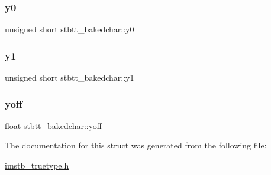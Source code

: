 \subsubsection{\texorpdfstring{y0}{y0}}
{\footnotesize\ttfamily unsigned short stbtt\+\_\+bakedchar\+::y0}

\mbox{\label{structstbtt__bakedchar_ac831dc667f6c39b5d22740c6cbd5bc3f}} 
\subsubsection{\texorpdfstring{y1}{y1}}
{\footnotesize\ttfamily unsigned short stbtt\+\_\+bakedchar\+::y1}

\mbox{\label{structstbtt__bakedchar_aba01393e52d1c6f4ce86a8b51e498bb4}} 
\subsubsection{\texorpdfstring{yoff}{yoff}}
{\footnotesize\ttfamily float stbtt\+\_\+bakedchar\+::yoff}



The documentation for this struct was generated from the following file\+:\begin{DoxyCompactItemize}
\item 
\mbox{\hyperlink{imstb__truetype_8h}{imstb\+\_\+truetype.\+h}}\end{DoxyCompactItemize}
